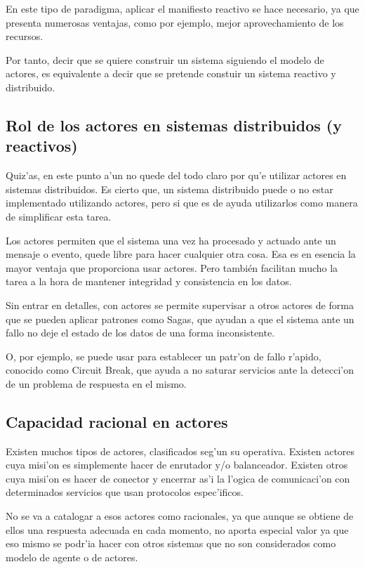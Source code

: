 \documentclass[12pt]{article}
\begin{document}
En este tipo de paradigma, aplicar el manifiesto reactivo se hace necesario, ya que presenta
numerosas ventajas, como por ejemplo, mejor aprovechamiento de los recursos.

Por tanto, decir que se quiere construir un sistema siguiendo el modelo de actores, es equivalente
a decir que se pretende constuir un sistema reactivo y distribuido.

\subsection{Rol de los actores en sistemas distribuidos (y reactivos)}
\label{sub:rol de los actores en sistemas distribuidos y reactivos}
Quiz'as, en este punto a'un no quede del todo claro por qu'e utilizar actores en sistemas distribuidos.
Es cierto que, un sistema distribuido puede o no estar implementado utilizando actores, pero
si que es de ayuda utilizarlos como manera de simplificar esta tarea.

Los actores permiten que el sistema una vez ha procesado y actuado ante un mensaje o evento, quede
libre para hacer cualquier otra cosa. Esa es en esencia la mayor ventaja que proporciona usar actores.
Pero también facilitan mucho la tarea a la hora de mantener integridad y consistencia en los datos.

Sin entrar en detalles, con actores se permite supervisar a otros actores de forma que se pueden
aplicar patrones como Sagas, que ayudan a que el sistema ante un fallo no deje el estado de los datos
de una forma inconsistente.

O, por ejemplo, se puede usar para establecer un patr'on de fallo r'apido, conocido como
Circuit Break, que ayuda a no saturar servicios ante la detecci'on de un problema de respuesta
en el mismo.

\subsection{Capacidad racional en actores}
\label{sub:capacidad racional en actores}
Existen muchos tipos de actores, clasificados seg'un su operativa. Existen actores cuya misi'on
es simplemente hacer de enrutador y/o balanceador. Existen otros cuya misi'on es hacer de conector y
encerrar as'i la l'ogica de comunicaci'on con determinados servicios que usan protocolos espec'ificos.

No se va a catalogar a esos actores como racionales, ya que aunque se obtiene de ellos una respuesta
adecuada en cada momento, no aporta especial valor ya que eso mismo se podr'ia hacer con otros sistemas
que no son considerados como modelo de agente o de actores.
\end{document}
